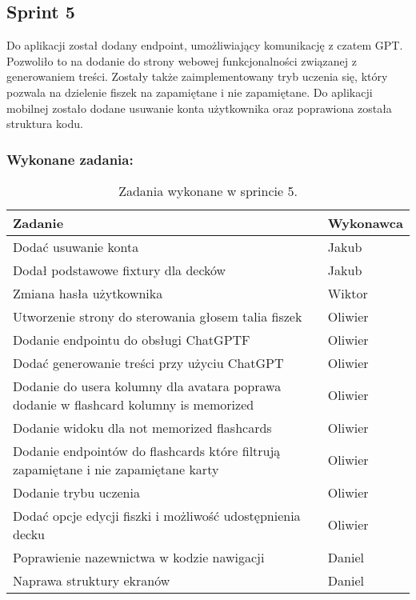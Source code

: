 \subsection{Sprint 5}

Do aplikacji został dodany endpoint, umożliwiający komunikację z czatem GPT. Pozwoliło to na dodanie do strony webowej funkcjonalności związanej z generowaniem treści. Zostały także zaimplementowany tryb uczenia się, który pozwala na dzielenie fiszek na zapamiętane i nie zapamiętane. Do aplikacji mobilnej zostało dodane usuwanie konta użytkownika oraz poprawiona została struktura kodu.

\subsubsection{Wykonane zadania:}

\begin{table}[H]
\centering
\begin{tabularx}{\textwidth}{|p{}|X|}
    \hline
    \textbf{Zadanie} & \textbf{Wykonawca} \\
    \hline
    [MOBILE] Dodać usuwanie konta & Jakub \\
    \hline
    [BACKEND] Dodał podstawowe fixtury dla decków & Jakub \\
    \hline
    [WEB] Zmiana hasła użytkownika & Wiktor \\
    \hline
    [WEB] Utworzenie strony do sterowania głosem talia fiszek & Oliwier \\
    \hline
    [BACKEND] Dodanie endpointu do obsługi ChatGPTF & Oliwier \\
    \hline
    [WEB] Dodać generowanie treści przy użyciu ChatGPT & Oliwier \\
    \hline
    [BACKEND] Dodanie do usera kolumny dla avatara poprawa dodanie w flashcard kolumny is memorized & Oliwier \\
    \hline
    [WEB] Dodanie widoku dla not memorized flashcards & Oliwier \\
    \hline
    [BACKEND] Dodanie endpointów do flashcards które filtrują zapamiętane i nie zapamiętane karty & Oliwier \\
    \hline
    [WEB] Dodanie trybu uczenia & Oliwier \\
    \hline
    [WEB] Dodać opcje edycji fiszki i możliwość udostępnienia decku & Oliwier \\
    \hline
    [MOBILE] Poprawienie nazewnictwa w kodzie nawigacji & Daniel \\
    \hline
    [MOBILE] Naprawa struktury ekranów & Daniel \\
    \hline
\end{tabularx}
                \caption{Zadania wykonane w sprincie 5.}
\end{table}

